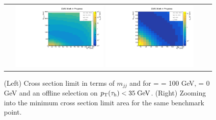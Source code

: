 \begin{figure}[tbh!]
	\centering
	\begin{tabular}{cc}
		\includegraphics[width=0.45\textwidth]{analysis/pics/JetInvMass_vs_MET_xsec_chi100_lsp000_taupt35.pdf}
		\includegraphics[width=0.45\textwidth]{analysis/pics/JetInvMass_vs_MET_xsec_chi100_lsp000_taupt35_zoom.pdf} 		
	\end{tabular}
	\caption{(Left) Cross section limit in terms of $m_{jj}$ and \met for \charginopm = \neutralinotwo = 100 GeV, \neutralinoone = 0 GeV and an offline selection on $p_{\text{T}}(\tau_{\text{h}}) <  35\;\text{Ge}\kern-0.06667em\text{V}$. (Right) Zooming into the minimum cross section limit area for the same benchmark point.}
	\label{fig::JetInvMass_vs_MET_xsec_chi100_lsp000_taupt35}
\end{figure}

